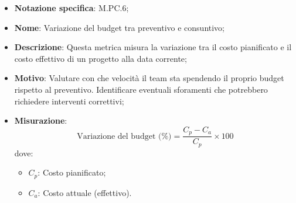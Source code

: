 \begin{itemize}
    \item \textbf{Notazione specifica}: M.PC.6;
    \item \textbf{Nome}: Variazione del budget tra preventivo e consuntivo;
    \item \textbf{Descrizione}: Questa metrica misura la variazione tra il costo pianificato e il costo effettivo di un progetto alla data corrente;
    \item \textbf{Motivo}: Valutare con che velocità il team sta spendendo il proprio budget rispetto al preventivo. Identificare eventuali sforamenti che potrebbero richiedere interventi correttivi;
    \item \textbf{Misurazione}:
    \[
        \text{Variazione del budget (\%)} =\frac{C_p - C_a}{C_p} \times 100
    \]
    dove:
    \begin{itemize}
        \item $C_{p}$: Costo pianificato;
        \item $C_{a}$: Costo attuale (effettivo).
    \end{itemize}
\end{itemize}
